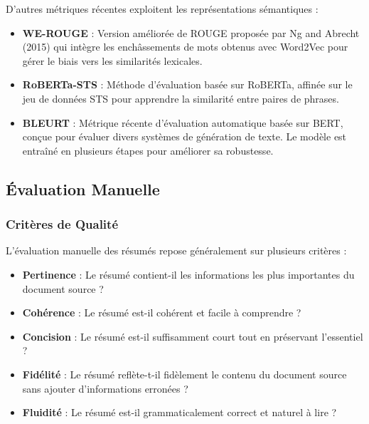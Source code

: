 D'autres métriques récentes exploitent les représentations sémantiques :

\begin{itemize}
    \item \textbf{WE-ROUGE} : Version améliorée de ROUGE proposée par Ng and Abrecht (2015) qui intègre les enchâssements de mots obtenus avec Word2Vec pour gérer le biais vers les similarités lexicales.
    
    \item \textbf{RoBERTa-STS} : Méthode d'évaluation basée sur RoBERTa, affinée sur le jeu de données STS pour apprendre la similarité entre paires de phrases.
    
    \item \textbf{BLEURT} : Métrique récente d'évaluation automatique basée sur BERT, conçue pour évaluer divers systèmes de génération de texte. Le modèle est entraîné en plusieurs étapes pour améliorer sa robustesse.
\end{itemize}

\subsection{Évaluation Manuelle}

\subsubsection{Critères de Qualité}

L'évaluation manuelle des résumés repose généralement sur plusieurs critères :

\begin{itemize}
    \item \textbf{Pertinence} : Le résumé contient-il les informations les plus importantes du document source ?
    
    \item \textbf{Cohérence} : Le résumé est-il cohérent et facile à comprendre ?
    
    \item \textbf{Concision} : Le résumé est-il suffisamment court tout en préservant l'essentiel ?
    
    \item \textbf{Fidélité} : Le résumé reflète-t-il fidèlement le contenu du document source sans ajouter d'informations erronées ?
    
    \item \textbf{Fluidité} : Le résumé est-il grammaticalement correct et naturel à lire ?
\end{itemize}

